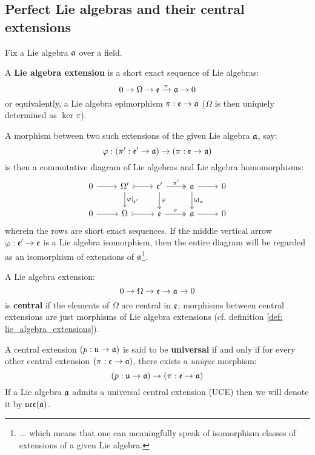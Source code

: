     \subsection{Perfect Lie algebras and their central extensions}
        \begin{definition} \label{def: lie_algebra_extensions}
            Fix a Lie algebra $\mathfrak{a}$ over a field.
        
            A \textbf{Lie algebra extension} is a short exact sequence of Lie algebras:
                $$0 \to \Omega \to \mathfrak{e} \xrightarrow[]{\pi} \mathfrak{a} \to 0$$
            or equivalently, a Lie algebra epimorphism $\pi: \mathfrak{e} \to \mathfrak{a}$ ($\Omega$ is then uniquely determined as $\ker \pi$). 
            
            A morphism between two such extensions of the given Lie algebra $\mathfrak{a}$, say:
                $$\varphi: (\pi': \mathfrak{e}' \to \mathfrak{a}) \to (\pi: \mathfrak{e} \to \mathfrak{a})$$
            is then a commutative diagram of Lie algebras and Lie algebra homomorphisms:
                $$
                    \begin{tikzcd}
                	0 & {\Omega'} & {\frake'} & \a & 0 \\
                	0 & \Omega & \frake & \a & 0
                	\arrow["{\varphi|_{\z'}}", from=1-2, to=2-2]
                	\arrow["\varphi", from=1-3, to=2-3]
                	\arrow["{\id_{\a}}", from=1-4, to=2-4]
                	\arrow[from=1-1, to=1-2]
                	\arrow[tail, from=1-2, to=1-3]
                	\arrow["{\pi'}", two heads, from=1-3, to=1-4]
                	\arrow[from=1-4, to=1-5]
                	\arrow[from=2-1, to=2-2]
                	\arrow[tail, from=2-2, to=2-3]
                	\arrow["\pi", two heads, from=2-3, to=2-4]
                	\arrow[from=2-4, to=2-5]
                    \end{tikzcd}
                $$
            wherein the rows are short exact sequences. If the middle vertical arrow $\varphi: \mathfrak{e}' \to \mathfrak{e}$ is a Lie algebra isomorphism, then the entire diagram will be regarded as an isomorphism of extensions of $\mathfrak{a}$\footnote{... which means that one can meaningfully speak of isomorphism classes of extensions of a given Lie algebra.}.
        \end{definition}
        \begin{definition} \label{def: central_lie_algebra_extensions}
            A Lie algebra extension:
                $$0 \to \Omega \to \mathfrak{e} \to \mathfrak{a} \to 0$$
            is \textbf{central} if the elements of $\Omega$ are central in $\mathfrak{e}$; morphisms between central extensions are just morphisms of Lie algebra extensions (cf. definition \ref{def: lie_algebra_extensions}).
            
            A central extension $(p: \mathfrak{u} \to \mathfrak{a})$ is said to be \textbf{universal} if and only if for every other central extension $(\pi: \mathfrak{e} \to \mathfrak{a})$, there exists a \textit{unique} morphism:
                $$(p: \mathfrak{u} \to \mathfrak{a}) \to (\pi: \mathfrak{e} \to \mathfrak{a})$$
            If a Lie algebra $\mathfrak{a}$ admits a universal central extension (UCE) then we will denote it by $\mathfrak{uce}(\mathfrak{a})$.
        \end{definition}

